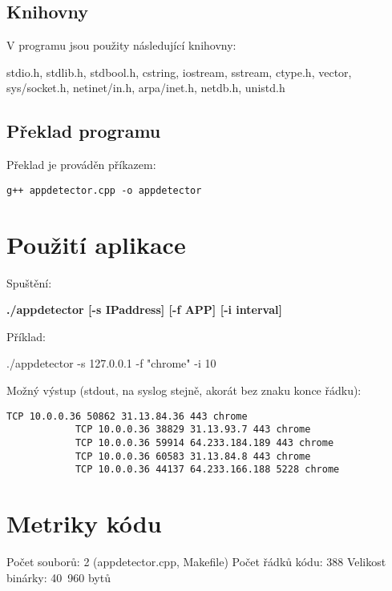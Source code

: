 \documentclass[a4paper]{article}
\begin{document}
	\subsection{Knihovny}

	V programu jsou použity následující knihovny:
	\begin{sloppypar}
	stdio.h, stdlib.h, stdbool.h, cstring, iostream, sstream, ctype.h, vector, sys/socket.h, netinet/in.h, arpa/inet.h, netdb.h, unistd.h
	\end{sloppypar}

	\subsection{Překlad programu}

	Překlad je prováděn příkazem:
	\begin{sloppypar}
		\begin{lstlisting}[breaklines]
			g++ appdetector.cpp -o appdetector
		\end{lstlisting}
	\end{sloppypar}

	\section{Použití aplikace}

	Spuštění:

	\textbf{./appdetector [-s IPaddress] [-f APP] [-i interval]}

	Příklad:

	./appdetector -s 127.0.0.1 -f "chrome" -i 10

	Možný výstup (stdout, na syslog stejně, akorát bez znaku konce řádku):

	\begin{sloppypar}
		\begin{lstlisting}[breaklines]
			TCP 10.0.0.36 50862 31.13.84.36 443 chrome
			TCP 10.0.0.36 38829 31.13.93.7 443 chrome
			TCP 10.0.0.36 59914 64.233.184.189 443 chrome
			TCP 10.0.0.36 60583 31.13.84.8 443 chrome
			TCP 10.0.0.36 44137 64.233.166.188 5228 chrome
		\end{lstlisting}
	\end{sloppypar}

	\section{Metriky kódu}

	Počet souborů: 2 (appdetector.cpp, Makefile)
	\newline
	Počet řádků kódu: 388
	\newline
	Velikost binárky: 40 960 bytů
\end{document}
